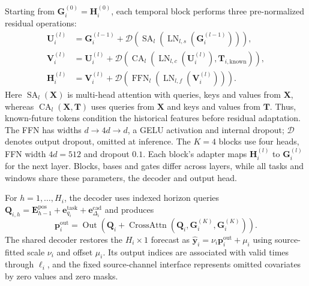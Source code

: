 \documentclass[journal]{IEEEtran}
\begin{document}
Starting from $\mathbf G_i^{(0)}=\mathbf H_i^{(0)}$, each temporal block performs three pre-normalized residual operations:
\begin{equation}
\label{eq:temporal-block}
\begin{aligned}
\mathbf U_i^{(l)}&=\mathbf G_i^{(l-1)}
+\mathcal D\!\left(\operatorname{SA}_l
(\operatorname{LN}_{l,s}(\mathbf G_i^{(l-1)}))\right),\\
\mathbf V_i^{(l)}&=\mathbf U_i^{(l)}
+\mathcal D\!\left(\operatorname{CA}_l
(\operatorname{LN}_{l,c}(\mathbf U_i^{(l)}),\mathbf T_{i,\mathrm{known}})\right),\\
\mathbf H_i^{(l)}&=\mathbf V_i^{(l)}
+\mathcal D\!\left(\operatorname{FFN}_l
(\operatorname{LN}_{l,f}(\mathbf V_i^{(l)}))\right).
\end{aligned}
\end{equation}
Here $\operatorname{SA}_l(\mathbf X)$ is multi-head attention with queries, keys and values from $\mathbf X$, whereas $\operatorname{CA}_l(\mathbf X,\mathbf T)$ uses queries from $\mathbf X$ and keys and values from $\mathbf T$. Thus, known-future tokens condition the historical features before residual adaptation. The FFN has widths $d\!\rightarrow\!4d\!\rightarrow\!d$, a GELU activation and internal dropout; $\mathcal D$ denotes output dropout, omitted at inference. The $K=4$ blocks use four heads, FFN width $4d=512$ and dropout $0.1$. Each block's adapter maps $\mathbf H_i^{(l)}$ to $\mathbf G_i^{(l)}$ for the next layer. Blocks, bases and gates differ across layers, while all tasks and windows share these parameters, the decoder and output head.

For $h=1,\ldots,H_i$, the decoder uses indexed horizon queries $\mathbf Q_{i,h}=\mathbf E_{h-1}^{\mathrm{pos}}+\mathbf e_{q_i}^{\mathrm{task}}+\mathbf e_{\Delta_i}^{\mathrm{cad}}$ and produces
\begin{equation}
\label{eq:shared-decoder}
\mathbf p_i^{\mathrm{out}}=\operatorname{Out}\!\left(
\mathbf Q_i+\operatorname{CrossAttn}(\mathbf Q_i,
\mathbf G_i^{(K)},\mathbf G_i^{(K)})\right).
\end{equation}
The shared decoder restores the $H_i\times1$ forecast as $\hat{\mathbf y}_i=\nu_i\mathbf p_i^{\mathrm{out}}+\mu_i$ using source-fitted scale $\nu_i$ and offset $\mu_i$. Its output indices are associated with valid times through $\boldsymbol\ell_i$, and the fixed source-channel interface represents omitted covariates by zero values and zero masks.
\end{document}
